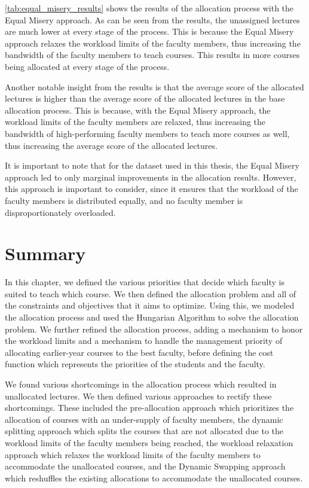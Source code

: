 \autoref{tab:equal_misery_results} shows the results of the allocation process with the Equal Misery approach. As can be seen from the results, the unassigned lectures are much lower at every stage of the process. This is because the Equal Misery approach relaxes the workload limits of the faculty members, thus increasing the bandwidth of the faculty members to teach courses. This results in more courses being allocated at every stage of the process.

Another notable insight from the results is that the average score of the allocated lectures is higher than the average score of the allocated lectures in the base allocation process. This is because, with the Equal Misery approach, the workload limits of the faculty members are relaxed, thus increasing the bandwidth of high-performing faculty members to teach more courses as well, thus increasing the average score of the allocated lectures.

It is important to note that for the dataset used in this thesis, the Equal Misery approach led to only marginal improvements in the allocation results. However, this approach is important to consider, since it ensures that the workload of the faculty members is distributed equally, and no faculty member is disproportionately overloaded.

\section{Summary}

In this chapter, we defined the various priorities that decide which faculty is suited to teach which course. We then defined the allocation problem and all of the constraints and objectives that it aims to optimize. Using this, we modeled the allocation process and used the Hungarian Algorithm to solve the allocation problem. We further refined the allocation process, adding a mechanism to honor the workload limits and a mechanism to handle the management priority of allocating earlier-year courses to the best faculty, before defining the cost function which represents the priorities of the students and the faculty.

We found various shortcomings in the allocation process which resulted in unallocated lectures. We then defined various approaches to rectify these shortcomings. These included the pre-allocation approach which prioritizes the allocation of courses with an under-supply of faculty members, the dynamic splitting approach which splits the courses that are not allocated due to the workload limits of the faculty members being reached, the workload relaxation approach which relaxes the workload limits of the faculty members to accommodate the unallocated courses, and the Dynamic Swapping approach which reshuffles the existing allocations to accommodate the unallocated courses.

